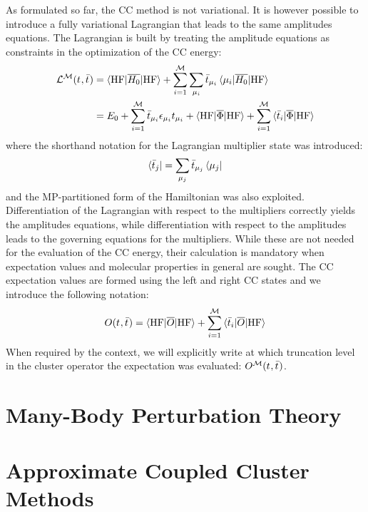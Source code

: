 As formulated so far, the \acrshort{CC} method is not variational. It is
however possible to introduce a fully variational Lagrangian that
leads to the same amplitudes equations. The Lagrangian is built by
treating the amplitude equations as constraints in the optimization of
the \acrshort{CC} energy:\autocite{Helgaker1982-xl, Arponen1983-qt,
Helgaker1988-to, Helgaker1989-wl, Koch1990-vr, Kvaal2013-jr}
\begin{equation}\label{eq:cc-lagrangian}
  \begin{aligned}
    \mathcal{L}^\mathcal{M}(t_{}, \bar{t}_{})
    &=
    \braket{\mathrm{HF} | \overline{H_0} | \mathrm{HF}}
    + \sum_{i=1}^{\mathcal{M}}\sum_{\mu_i}
    \bar{t}_{\mu_i}\braket{\mu_i | \overline{H_0} | \mathrm{HF}} \\
    &=
  E_0
  + \sum_{i=1}^{\mathcal{M}}\bar{t}_{\mu_i}\epsilon_{\mu_i}t_{\mu_i}
  + \braket{\mathrm{HF} | \overline{\Phi} | \mathrm{HF}}
  + \sum_{i=1}^{\mathcal{M}}\braket{\bar{t}_{i} | \overline{\Phi} | \mathrm{HF}}
  \end{aligned}
\end{equation}
where the shorthand notation for the Lagrangian multiplier state was
introduced:
\begin{equation}
  \bra{\bar{t}_{j}} = \sum_{\mu_j}\bar{t}_{\mu_j}\bra{\mu_j}
\end{equation}
and the \acrshort{MP}-partitioned form of the Hamiltonian was also exploited.
Differentiation of the Lagrangian with respect to the multipliers
correctly yields the amplitudes equations, while differentiation with
respect to the amplitudes leads to the governing equations for the
multipliers. While these are not needed for the evaluation of the
\acrshort{CC} energy, their calculation is mandatory when expectation values
and molecular properties in general are sought.
The \acrshort{CC} expectation values are formed using the left and
right \acrshort{CC} states and we introduce the following notation:
\begin{equation}
  O(t_{}, \bar{t}_{}) = \braket{\mathrm{HF} | \overline{O} | \mathrm{HF} }
  + \sum_{i=1}^{\mathcal{M}}\braket{\bar{t}_{i} | \overline{O} | \mathrm{HF} }
\end{equation}
When required by the context, we will explicitly write at which
truncation level in the cluster operator the expectation was evaluated:
$O^\mathcal{M}(t_{}, \bar{t}_{})$.

\section{Many-Body Perturbation Theory}\label{sec:mbpt}
\section{Approximate Coupled Cluster Methods}\label{sec:cc-approximate}
